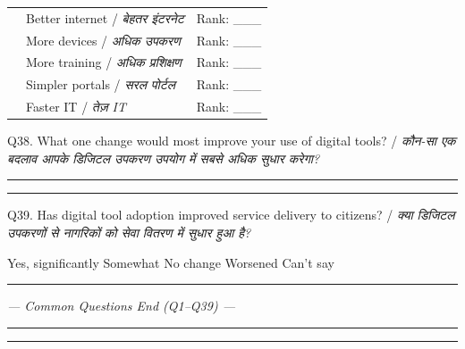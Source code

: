 \documentclass[10pt,a4paper]{article}
\begin{document}
\noindent\begin{tabularx}{\textwidth}{@{}L{0.8cm} X L{1.5cm}@{}}
 & Better internet / {\hindifont\small\itshape\color{black!70} बेहतर इंटरनेट} & Rank: \_\_\_ \\[2pt]
 & More devices / {\hindifont\small\itshape\color{black!70} अधिक उपकरण} & Rank: \_\_\_ \\[2pt]
 & More training / {\hindifont\small\itshape\color{black!70} अधिक प्रशिक्षण} & Rank: \_\_\_ \\[2pt]
 & Simpler portals / {\hindifont\small\itshape\color{black!70} सरल पोर्टल} & Rank: \_\_\_ \\[2pt]
 & Faster IT / {\hindifont\small\itshape\color{black!70} तेज़ IT} & Rank: \_\_\_ \\[2pt]
\end{tabularx}
\vspace{3pt}\noindent Q38. What one change would most improve your use of digital tools? / {\hindifont\small\itshape\color{black!70} कौन-सा एक बदलाव आपके डिजिटल उपकरण उपयोग में सबसे अधिक सुधार करेगा?}\vspace{3pt}

\noindent\rule{\textwidth}{0.4pt}\vspace{3pt}\rule{\textwidth}{0.4pt}\vspace{3pt}
\noindent Q39. Has digital tool adoption improved service delivery to citizens? / {\hindifont\small\itshape\color{black!70} क्या डिजिटल उपकरणों से नागरिकों को सेवा वितरण में सुधार हुआ है?}\vspace{2pt}

\noindent {\Large$\square$} Yes, significantly\quad{\Large$\square$} Somewhat\quad{\Large$\square$} No change\quad{\Large$\square$} Worsened\quad{\Large$\square$} Can't say
\vspace{3pt}\noindent\rule{\textwidth}{1pt}\vspace{2pt}
\begin{center}\textit{--- Common Questions End (Q1--Q39) ---}\end{center}\rule{\textwidth}{0.5pt}
\newpage
\noindent\rule{\textwidth}{0.3pt}\vspace{3pt}
\vspace{3pt}
\end{document}
